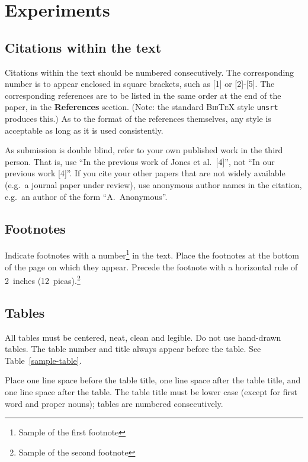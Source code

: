 \documentclass{article} %
\begin{document}
\section{Experiments}

\subsection{Citations within the text}

Citations within the text should be numbered consecutively. The corresponding
number is to appear enclosed in square brackets, such as [1] or [2]-[5]. The
corresponding references are to be listed in the same order at the end of the
paper, in the \textbf{References} section. (Note: the standard
\textsc{Bib\TeX} style \texttt{unsrt} produces this.) As to the format of the
references themselves, any style is acceptable as long as it is used
consistently.

As submission is double blind, refer to your own published work in the 
third person. That is, use ``In the previous work of Jones et al.\ [4]'',
not ``In our previous work [4]''. If you cite your other papers that
are not widely available (e.g.\ a journal paper under review), use
anonymous author names in the citation, e.g.\ an author of the
form ``A.\ Anonymous''. 

\subsection{Footnotes}

Indicate footnotes with a number\footnote{Sample of the first footnote} in the
text. Place the footnotes at the bottom of the page on which they appear.
Precede the footnote with a horizontal rule of 2~inches
(12~picas).\footnote{Sample of the second footnote}

\subsection{Tables}

All tables must be centered, neat, clean and legible. Do not use hand-drawn
tables. The table number and title always appear before the table. See
Table~\ref{sample-table}.

Place one line space before the table title, one line space after the table
title, and one line space after the table. The table title must be lower case
(except for first word and proper nouns); tables are numbered consecutively.
\end{document}
